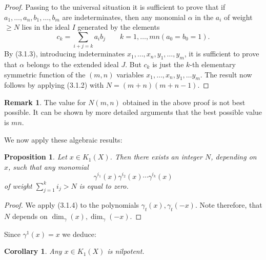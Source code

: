 \documentclass[leqno]{book}
\numberwithin{equation}{section}
\newtheorem{proposition}[theorem]{Proposition}
\newtheorem{corollary}[theorem]{Corollary}
\theoremstyle{definition}
\newtheorem*{remark}{Remark}
\begin{document}
            \begin{proof}
              Passing to the universal situation it is sufficient to prove that if $a_1, \ldots ,a_{n},b_1, \ldots ,b_{m}$ are indeterminates, then any monomial $\alpha$ in the $a_{i}$ of weight $\ge N$ lies in the ideal $I$ generated by the elements
              \begin{equation*}
                c_{k}=\sum_{i+j=k} a_{i} b_{j}\qquad k=1, \ldots ,mn (a_0=b_0=1).
              \end{equation*}
              By (3.1.3), introducing indeterminates $x_1, \ldots ,x_{n},y_1, \ldots ,y_{m}$, it is sufficient to prove that $\alpha$ belongs to the extended ideal $J$. But $c_{k}$ is just the $k$-th elementary symmetric function of the $(m,n)$ variables $x_1, \ldots ,x_{n},y_1, \ldots y_{m}$. The result now follows by applying (3.1.2) with $N=(m+n)(m+n-1)$.
            \end{proof}

            \begin{remark}
              The value for $N(m,n)$ obtained in the above proof is not best possible. It can be shown by more detailed arguments that the best possible value is $mn$.
            \end{remark}

            We now apply these algebraic results:

            \begin{proposition}
              Let $x\in K_1(X)$. Then there exists an integer $N$, depending on $x$, such that any monomial
              \begin{equation*}
                \gamma^{i_1}(x)\gamma^{i_2}(x)\cdots \gamma^{i_{k}}(x)
              \end{equation*}
              of weight $\sum_{j=1}^{k} i_{j}>N$ is equal to zero.
            \end{proposition}

            \begin{proof}
              We apply (3.1.4) to the polynomials $\gamma_{t}(x),\gamma_{t}(-x)$. Note therefore, that $N$ depends on $\operatorname{dim}_{\gamma}(x),\operatorname{dim}_{\gamma}(-x)$.
            \end{proof}

            Since $\gamma^{1}(x)=x$ we deduce:

            \begin{corollary}
              Any $x \in K_{1}(X)$ is nilpotent.
            \end{corollary}
\end{document}
